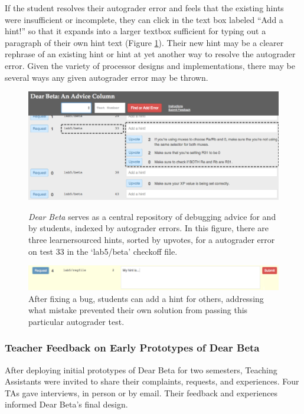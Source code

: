 If the student resolves their autograder error and feels that the existing hints were insufficient or incomplete, they can click in the text box labeled ``Add a hint!'' so that it expands into a larger textbox sufficient for typing out a paragraph of their own hint text (Figure \ref{fig:contrib}). Their new hint may be a clearer rephrase of an existing hint or hint at yet another way to resolve the autograder error. Given the variety of processor designs and implementations, there may be several ways any given autograder error may be thrown. 

\begin{figure}
\centering
\includegraphics[width=1.0\columnwidth]{Body/figures/classoverflow/hints_modified.png}
\caption{{\it Dear Beta} serves as a central repository of debugging advice for and by students, indexed by autograder errors. In this figure, there are three learnersourced hints, sorted by upvotes, for a autograder error on test 33 in the `lab5/beta' checkoff file.}
\label{fig:hints}

\bigskip
\centering
\includegraphics[width=1.0\columnwidth]{Body/figures/classoverflow/contrib_shortened.png}
\caption{After fixing a bug, students can add a hint for others, addressing what mistake prevented their own solution from passing this particular autograder test.}
\label{fig:contrib}
\end{figure}

\subsubsection{Teacher Feedback on Early Prototypes of Dear Beta}


After deploying initial prototypes of Dear Beta for two semesters, Teaching Assistants were invited to share their complaints, requests, and experiences. Four TAs gave interviews, in person or by email. Their feedback and experiences informed Dear Beta's final design.

